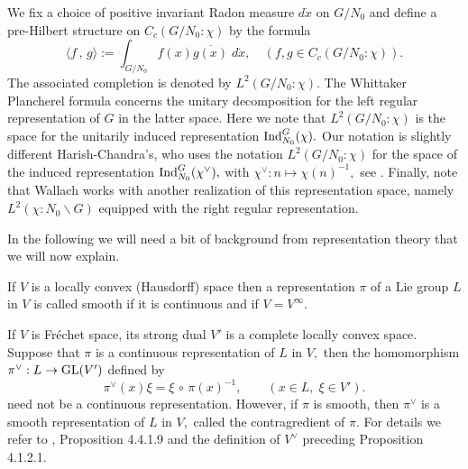 \documentclass[12pt,a4paper]{article}
\def\qquad{\quad\quad}
\def\to{\rightarrow}
\def\inp#1#2{\langle#1\,,\,#2\rangle}
\def\after{\,{\scriptstyle\circ}\,}
\def\bs{{\backslash}}
\numberwithin{Thm}{section}
\numberwithin{equation}{section}
\def\bN{N}
\def\Ind{{\rm Ind}}
\numberwithin{equation}{section}
\def\col{\!:\!}
\def\cchi{\chi}
\def\veec{\vee}%
\begin{document}
We fix a choice of positive invariant Radon measure $d \dot{x}$ on $G/N_0$ and define a
pre-Hilbert structure on $C_c(G/\bN_0\col \cchi)$  by the formula 
$$ 
\inp{f}{g} := \int_{G/N_0} f(x)\overline{ g(x)} \; d \dot{x},\quad (f,g \in C_c(G/N_0\col \cchi)).
$$%
The associated completion is denoted by $L^2(G/\bN_0\col \cchi).$ 
The Whittaker Plancherel formula concerns the unitary decomposition for the left regular representation of $G$ in the latter space.
Here we note that 
 $L^2(G/\bN_0\col \cchi)$ is  the space for the unitarily 
induced representation $\Ind_{\bN_0}^G(\cchi).$ Our notation is slightly different 
Harish-Chandra's,  who uses the notation $L^2(G/\bN_0\col \cchi)$ for the space of 
the induced representation
$\Ind_{\bN_0}^G(\cchi^\veec),$ with $\cchi^\veec: n\mapsto \cchi(n)^{-1},$ 
see \cite[p.~143]{HCwhit}.
Finally, note that Wallach \cite[p.~365]{Wrrg2} works with another realization of this representation space, namely $L^2(\cchi\col N_0 \bs G)$ equipped with the right regular representation. 

In the following we will need a bit of background from representation theory that we will now 
explain. 


If $V$ is a locally convex (Hausdorff) space then a representation $\pi$ of a Lie group $L$ in 
$V$ is called smooth if it is continuous and if $V = V^\infty.$ 

If $V$ is  Fr\'echet space, its strong dual $V'$ is a complete locally convex space.
Suppose that $\pi$ is a continuous representation of $L$ in $V,$ then the homomorphism 
$\pi^\veec: L \to {\rm GL}(V')$ defined by 
\begin{equation}
\label{e: contragredient}
\pi^\veec(x)\xi = \xi\after \pi(x)^{-1}, \qquad (x \in L, \;\xi \in V').
\end{equation}
need not be a continuous representation. However, if $\pi$ is smooth, then $\pi^\veec$ is a smooth representation of $L$ in $V,$ called the contragredient
of $\pi.$ For details we refer to  \cite{Warn1}, Proposition 4.4.1.9 and the definition of $V^\veec$ preceding 
Proposition 4.1.2.1. 
\end{document}
